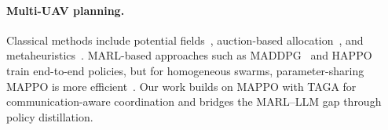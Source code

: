 \paragraph{Multi-UAV planning.}
Classical methods include potential fields~\cite{ge2002dynamic}, auction-based
allocation~\cite{choi2009consensus}, and metaheuristics~\cite{dorigo2006ant}.
MARL-based approaches such as MADDPG~\cite{lowe2017multi} and
HAPPO~\cite{kuba2022trust} train end-to-end policies, but for homogeneous
swarms, parameter-sharing MAPPO is more efficient~\cite{yu2022surprising}.  Our
work builds on MAPPO with TAGA for communication-aware coordination and bridges
the MARL--LLM gap through policy distillation.
